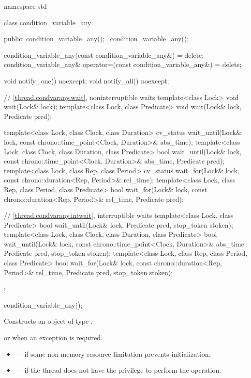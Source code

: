 %
\begin{codeblock}
namespace std {
  class condition_variable_any {
  public:
    condition_variable_any();
    ~condition_variable_any();

    condition_variable_any(const condition_variable_any&) = delete;
    condition_variable_any& operator=(const condition_variable_any&) = delete;

    void notify_one() noexcept;
    void notify_all() noexcept;

    // \ref{thread.condvarany.wait}, noninterruptible waits
    template<class Lock>
      void wait(Lock& lock);
    template<class Lock, class Predicate>
      void wait(Lock& lock, Predicate pred);

    template<class Lock, class Clock, class Duration>
      cv_status wait_until(Lock& lock, const chrono::time_point<Clock, Duration>& abs_time);
    template<class Lock, class Clock, class Duration, class Predicate>
      bool wait_until(Lock& lock, const chrono::time_point<Clock, Duration>& abs_time,
                      Predicate pred);
    template<class Lock, class Rep, class Period>
      cv_status wait_for(Lock& lock, const chrono::duration<Rep, Period>& rel_time);
    template<class Lock, class Rep, class Period, class Predicate>
      bool wait_for(Lock& lock, const chrono::duration<Rep, Period>& rel_time, Predicate pred);

    // \ref{thread.condvarany.intwait}, interruptible waits
    template<class Lock, class Predicate>
      bool wait_until(Lock& lock, Predicate pred, stop_token stoken);
    template<class Lock, class Clock, class Duration, class Predicate>
      bool wait_until(Lock& lock, const chrono::time_point<Clock, Duration>& abs_time
                      Predicate pred, stop_token stoken);
    template<class Lock, class Rep, class Period, class Predicate>
      bool wait_for(Lock& lock, const chrono::duration<Rep, Period>& rel_time,
                    Predicate pred, stop_token stoken);
  };
}
\end{codeblock}

%
\begin{itemdecl}
condition_variable_any();
\end{itemdecl}

\begin{itemdescr}
\pnum
\effects Constructs an object of type .

\pnum
\throws {} or  when an exception is
required.

\pnum
\errors
\begin{itemize}
\item {} --- if some non-memory resource
limitation prevents initialization.

\item {} --- if the thread does not have the
privilege to perform the operation.
\end{itemize}
\end{itemdescr}

